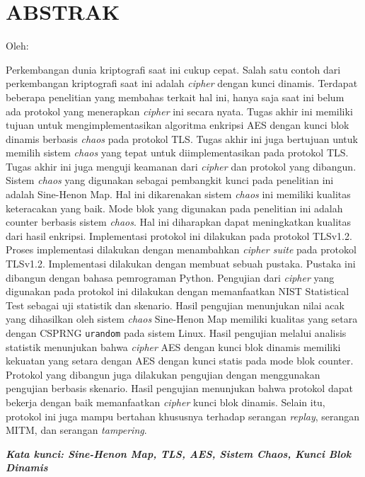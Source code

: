 \clearpage
\chapter*{ABSTRAK}

\begin{center}
  \center
  \begin{singlespace}
    \bfseries \MakeUppercase{\thetitle}

    \normalfont\normalsize
    Oleh:
    \bfseries \theauthor
  \end{singlespace}
\end{center}


\begin{singlespace}
  Perkembangan dunia kriptografi saat ini cukup cepat. Salah satu contoh dari perkembangan kriptografi saat ini adalah \emph{cipher} dengan kunci dinamis. Terdapat beberapa penelitian yang membahas terkait hal ini, hanya saja saat ini belum ada protokol yang menerapkan \emph{cipher} ini secara nyata. Tugas akhir ini memiliki tujuan untuk mengimplementasikan algoritma enkripsi AES dengan kunci blok dinamis berbasis \emph{chaos} pada protokol TLS. Tugas akhir ini juga bertujuan untuk memilih sistem \emph{chaos} yang tepat untuk diimplementasikan pada protokol TLS. Tugas akhir ini juga menguji keamanan dari \emph{cipher} dan protokol yang dibangun. Sistem \emph{chaos} yang digunakan sebagai pembangkit kunci pada penelitian ini adalah Sine-Henon Map. Hal ini dikarenakan sistem \emph{chaos} ini memiliki kualitas keteracakan yang baik. Mode blok yang digunakan pada penelitian ini adalah counter berbasis sistem \emph{chaos}. Hal ini diharapkan dapat meningkatkan kualitas dari hasil enkripsi. Implementasi protokol ini dilakukan pada protokol TLSv1.2. Proses implementasi dilakukan dengan menambahkan \emph{cipher suite} pada protokol TLSv1.2. Implementasi dilakukan dengan membuat sebuah pustaka. Pustaka ini dibangun dengan bahasa pemrograman Python. Pengujian dari \emph{cipher} yang digunakan pada protokol ini dilakukan dengan memanfaatkan NIST Statistical Test sebagai uji statistik dan skenario. Hasil pengujian menunjukan nilai acak yang dihasilkan oleh sistem \emph{chaos} Sine-Henon Map memiliki kualitas yang setara dengan CSPRNG \texttt{urandom} pada sistem Linux. Hasil pengujian melalui analisis statistik menunjukan bahwa \emph{cipher} AES dengan kunci blok dinamis memiliki kekuatan yang setara dengan AES dengan kunci statis pada mode blok counter. Protokol yang dibangun juga dilakukan pengujian dengan menggunakan pengujian berbasis skenario. Hasil pengujian menunjukan bahwa protokol dapat bekerja dengan baik memanfaatkan \emph{cipher} kunci blok dinamis. Selain itu, protokol ini juga mampu bertahan khususnya terhadap serangan \emph{replay}, serangan MITM, dan serangan \emph{tampering}.
  
  \textbf{\textit{Kata kunci: Sine-Henon Map, TLS, AES, Sistem Chaos, Kunci Blok Dinamis }}
\end{singlespace}
\clearpage
